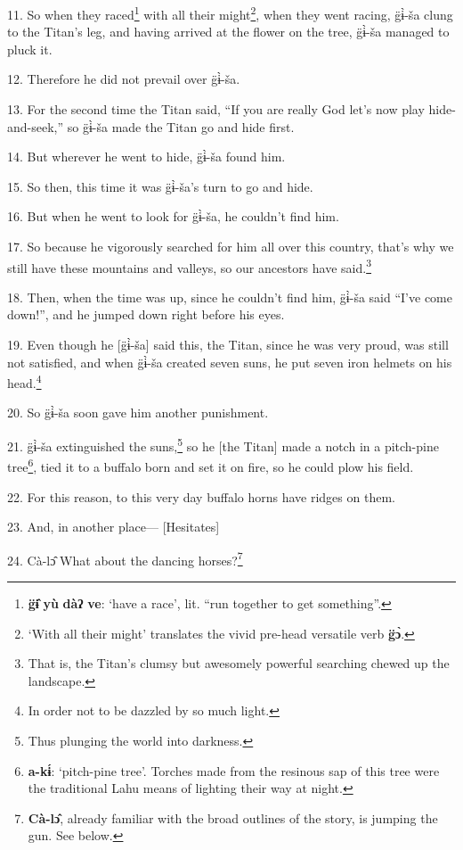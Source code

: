11. So when they raced\footnote{\textbf{g̈ɨ̂} \textbf{yù} \textbf{dàʔ} \textbf{ve}: `have a race', lit. ``run together to get something''.} with all their might\footnote{`With all their might' translates the vivid pre-head versatile verb \textbf{g̈ɔ̀}.}, when they went racing, g̈ɨ̀-ša
clung to the Titan's leg, and having arrived at the flower on the tree, g̈ɨ̀-ša
managed to pluck it.

12. Therefore he did not prevail over g̈ɨ̀-ša.

13. For the second time the Titan said, ``If you are really God let's now play
hide-and-seek,'' so g̈ɨ̀-ša made the Titan go and hide first.

14. But wherever he went to hide, g̈ɨ̀-ša found him.

15. So then, this time it was g̈ɨ̀-ša's turn to go and hide.

16. But when he went to look for g̈ɨ̀-ša, he couldn't find him.

17. So because he vigorously searched for him all over this country, that's why
we still have these mountains and valleys, so our ancestors have said.\footnote{That is, the Titan's clumsy but awesomely powerful searching chewed up the landscape.}

18. Then, when the time was up, since he couldn't find him, g̈ɨ̀-ša said ``I've
come down!'', and he jumped down right before his eyes.

19. Even though he [g̈ɨ̀-ša] said this, the Titan, since he was very proud,
was still not satisfied, and when g̈ɨ̀-ša created seven suns, he put seven
iron helmets on his head.\footnote{In order not to be dazzled by so much light.}

20. So g̈ɨ̀-ša soon gave him another punishment.

21. g̈ɨ̀-ša extinguished the suns,\footnote{Thus plunging the world into darkness.} so he [the Titan] made a notch in a
pitch-pine tree\footnote{\textbf{a-kɨ́}: `pitch-pine tree'. Torches made from the resinous sap of this tree were the traditional Lahu means of lighting their way at night.}, tied it to a buffalo born and set it on fire, so he could
plow his field.

22. For this reason, to this very day buffalo horns have ridges on them.

23. And, in another place--- [Hesitates]

24. Cà-lɔ̂  What about the dancing horses?\footnote{\textbf{Cà-lɔ̂}, already familiar with the broad outlines of the story, is jumping the gun. See below.}

